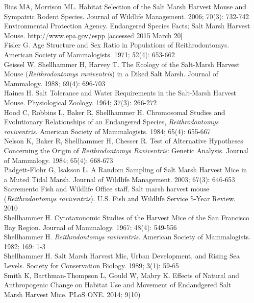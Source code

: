\documentclass[a4paper]{article}
\begin{document}
Bias MA, Morrison ML. Habitat Selection of the Salt Marsh Harvest Mouse and Sympatric Rodent Species. Journal of Wildlife Management. 2006; 70(3): 732-742\\
Environmental Protection Agency. Endangered Species Facts; Salt Marsh Harvest Mouse. http://www.epa.gov/espp [accessed 2015 March 20]\\
Fisler G. Age Structure and Sex Ratio in Populations of Reithrodontomys. American Society of Mammalogists. 1971; 52(4): 653-662\\
Geissel W, Shellhammer H, Harvey T. The Ecology of the Salt-Marsh Harvest Mouse (\textit{Reithrodontomys raviventris}) in a Diked Salt Marsh. Journal of Mammalogy. 1988; 69(4): 696-703\\
Haines H. Salt Tolerance and Water Requirements in the Salt-Marsh Harvest Mouse. Physiological Zoology. 1964; 37(3): 266-272\\
Hood C, Robbins L, Baker R, Shellhammer H. Chromosomal Studies and Evolutionary Relationships of an Endangered Species, \textit{Reithrodontomys raviventris}. American Society of Mammalogists. 1984; 65(4): 655-667\\
Nelson K, Baker R, Shellhammer H, Chesser R. Test of Alternative Hypotheses Concerning the Origin of \textit{Reithrodontomys Raviventris}: Genetic Analysis. Journal of Mammalogy. 1984; 65(4): 668-673\\
Padgett-Flohr G, Isakson L. A Random Sampling of Salt Marsh Harvest Mice in a Muted Tidal Marsh. Journal of Wildlife Management. 2003; 67(3): 646-653\\
Sacremento Fish and Wildlife Office staff. Salt marsh harvest mouse (\textit{Reithrodontomys raviventris}). U.S. Fish and Wildlife Service 5-Year Review. 2010\\
Shellhammer H. Cytotaxonomic Studies of the Harvest Mice of the San Francisco Bay Region. Journal of Mammalogy. 1967; 48(4): 549-556\\
Shellhammer H. \textit{Reithrodontomys raviventris}. American Society of Mammalogists. 1982; 169: 1-3\\
Shellhammer H. Salt Marsh Harvest Mic, Urban Development, and Rising Sea Levels. Society for Conservation Biology. 1989; 3(1): 59-65\\
Smith K, Barthman-Thompson L, Gould W, Mabry K. Effects of Natural and Anthropogenic Change on Habitat Use and Movement of Endandgered Salt Marsh Harvest Mice. PLoS ONE. 2014; 9(10)\\
\end{document}
